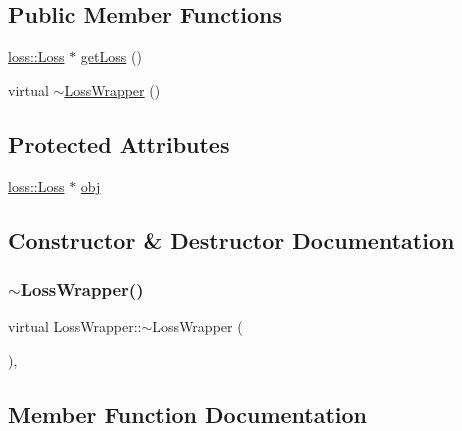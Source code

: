 \subsection*{Public Member Functions}
\begin{DoxyCompactItemize}
\item 
\mbox{\hyperlink{classloss_1_1_loss}{loss\+::\+Loss}} $\ast$ \mbox{\hyperlink{class_loss_wrapper_a7b1abc6f1d1fd9c2fbc439ee32a0f844}{get\+Loss}} ()
\item 
virtual \mbox{\hyperlink{class_loss_wrapper_a86f760c0c1f8c43e94718ba5687fb182}{$\sim$\+Loss\+Wrapper}} ()
\end{DoxyCompactItemize}
\subsection*{Protected Attributes}
\begin{DoxyCompactItemize}
\item 
\mbox{\hyperlink{classloss_1_1_loss}{loss\+::\+Loss}} $\ast$ \mbox{\hyperlink{class_loss_wrapper_a2902226f55d916ef64fdd4da3179630a}{obj}}
\end{DoxyCompactItemize}


\subsection{Constructor \& Destructor Documentation}
\mbox{\label{class_loss_wrapper_a86f760c0c1f8c43e94718ba5687fb182}} 
\subsubsection{\texorpdfstring{$\sim$\+Loss\+Wrapper()}{~LossWrapper()}}
{\footnotesize\ttfamily virtual Loss\+Wrapper\+::$\sim$\+Loss\+Wrapper (\begin{DoxyParamCaption}{ }\end{DoxyParamCaption})\hspace{0.3cm}{\ttfamily [inline]}, {\ttfamily [virtual]}}



\subsection{Member Function Documentation}
\mbox{\label{class_loss_wrapper_a7b1abc6f1d1fd9c2fbc439ee32a0f844}} 
